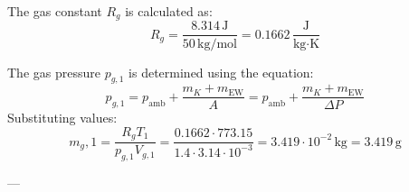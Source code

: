 The gas constant \( R_g \) is calculated as:  
\[
R_g = \frac{8.314 \, \text{J}}{50 \, \text{kg/mol}} = 0.1662 \, \frac{\text{J}}{\text{kg·K}}
\]  

The gas pressure \( p_{g,1} \) is determined using the equation:  
\[
p_{g,1} = p_{\text{amb}} + \frac{m_K + m_{\text{EW}}}{A} = p_{\text{amb}} + \frac{m_K + m_{\text{EW}}}{\Delta P}
\]  
Substituting values:  
\[
m_g,1 = \frac{R_g T_1}{p_{g,1} V_{g,1}} = \frac{0.1662 \cdot 773.15}{1.4 \cdot 3.14 \cdot 10^{-3}} = 3.419 \cdot 10^{-2} \, \text{kg} = 3.419 \, \text{g}
\]  

---